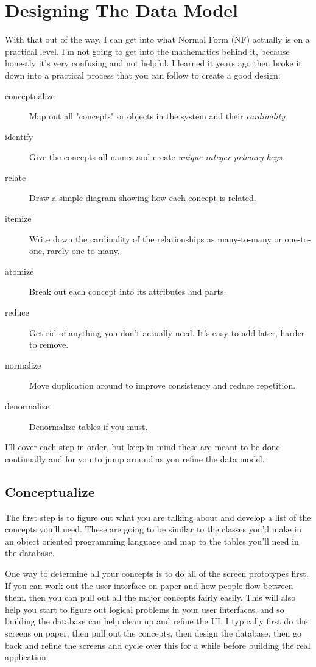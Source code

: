 \section{Designing The Data Model}

With that out of the way, I can get into what Normal Form (NF) actually is on a practical
level.  I'm not going to get into the mathematics behind it, because honestly it's very
confusing and not helpful.  I learned it years ago then broke it down into a practical
process that you can follow to create a good design:

\begin{description}
\item[conceptualize] Map out all "concepts" or objects in the system and their \emph{cardinality}.
\item[identify] Give the concepts all names and create \emph{unique integer primary keys}.
\item[relate] Draw a simple diagram showing how each concept is related.
\item[itemize] Write down the cardinality of the relationships as many-to-many or one-to-one, rarely one-to-many.
\item[atomize] Break out each concept into its attributes and parts.
\item[reduce] Get rid of anything you don't actually need.  It's easy to add later, harder to remove.
\item[normalize] Move duplication around to improve consistency and reduce repetition.
\item[denormalize] Denormalize tables if you must.
\end{description}

I'll cover each step in order, but keep in mind these are meant to be done continually and for you
to jump around as you refine the data model.

\subsection{Conceptualize}

The first step is to figure out what you are talking about and develop a list of the concepts you'll
need.  These are going to be similar to the classes you'd make in an object oriented programming
language and map to the tables you'll need in the database.

One way to determine all your concepts is to do all of the screen prototypes first.  If you can
work out the user interface on paper and how people flow between them, then you can pull out
all the major concepts fairly easily.  This will also help you start to figure out logical 
problems in your user interfaces, and so building the database can help clean up and refine
the UI.  I typically first do the screens on paper, then pull out the concepts, then design
the database, then go back and refine the screens and cycle over this for a while before
building the real application.


